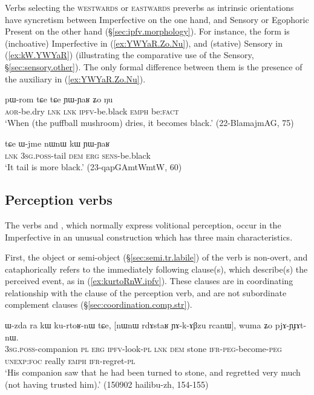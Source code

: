 Verbs selecting the \textsc{westwards} or \textsc{eastwards} preverbs as intrinsic orientations have syncretism between Imperfective on the one hand, and Sensory or Egophoric Present on the other hand (§\ref{sec:ipfv.morphology}). For instance, the form  is (inchoative) Imperfective in (\ref{ex:YWYaR.Zo.Nu}), and (stative) Sensory in (\ref{ex:kW.YWYaR}) (illustrating the comparative use of the Sensory, §\ref{sec:sensory.other}). The only formal difference between them is the presence of the auxiliary  in (\ref{ex:YWYaR.Zo.Nu}).

\begin{exe}
\ex \label{ex:YWYaR.Zo.Nu}
\gll  pɯ-rom tɕe tɕe ɲɯ-ɲaʁ ʑo ŋu \\
\textsc{aor}-be.dry \textsc{lnk} \textsc{lnk} \textsc{ipfv}-be.black \textsc{emph} be:\textsc{fact} \\
\glt `When (the puffball mushroom) dries, it becomes black.' (22-BlamajmAG, 75)
\end{exe}

\begin{exe}
\ex \label{ex:kW.YWYaR}
\gll  tɕe ɯ-jme nɯnɯ kɯ ɲɯ-ɲaʁ \\
\textsc{lnk} \textsc{3sg}.\textsc{poss}-tail \textsc{dem} \textsc{erg} \textsc{sens}-be.black \\
\glt `It tail is more black.' (23-qapGAmtWmtW, 60)
\end{exe}


\subsection{Perception verbs} \label{sec:ipfv.perception}
The verbs  and , which normally express volitional perception, occur in the Imperfective in an unusual construction which has three main characteristics. 

First, the object or semi-object (§\ref{sec:semi.tr.labile}) of the verb is non-overt, and cataphorically refers to the immediately following clause(s), which describe(s) the perceived event, as in (\ref{ex:kurtoRnW.ipfv}). These clauses are in coordinating relationship with the clause of the perception verb, and are not subordinate complement clauses (§\ref{sec:coordination.comp.str}).

\begin{exe}
\ex \label{ex:kurtoRnW.ipfv}
\gll ɯ-zda ra kɯ ku-rtoʁ-nɯ tɕe, [nɯnɯ rdɤstaʁ ɲɤ-k-ɤβzu rcanɯ], wuma ʑo pjɤ-ɲɟɤt-nɯ. \\
\textsc{3sg}.\textsc{poss}-companion \textsc{pl} \textsc{erg} \textsc{ipfv}-look-\textsc{pl} \textsc{lnk} \textsc{dem} stone \textsc{ifr}-\textsc{peg}-become-\textsc{peg} \textsc{unexp}:\textsc{foc} really \textsc{emph} \textsc{ifr}-regret-\textsc{pl} \\
\glt `His companion saw that he had been turned to stone, and regretted very much (not having trusted him).' (150902 hailibu-zh, 154-155)
\end{exe}

